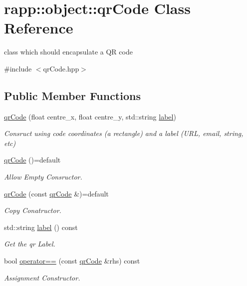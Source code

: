 \hypertarget{classrapp_1_1object_1_1qrCode}{\section{rapp\-:\-:object\-:\-:qr\-Code Class Reference}
\label{classrapp_1_1object_1_1qrCode}
}


class which should encapsulate a Q\-R code  




{\ttfamily \#include $<$qr\-Code.\-hpp$>$}

\subsection*{Public Member Functions}
\begin{DoxyCompactItemize}
\item 
\hyperlink{classrapp_1_1object_1_1qrCode_a554b8eae4e757f48bc4b8448e81e59a1}{qr\-Code} (float centre\-\_\-x, float centre\-\_\-y, std\-::string \hyperlink{classrapp_1_1object_1_1qrCode_aa794b7ec326c02e576d18f4eefb1728b}{label})
\begin{DoxyCompactList}\small\item\em Consruct using code coordinates (a rectangle) and a label (U\-R\-L, email, string, etc) \end{DoxyCompactList}\item 
\hyperlink{classrapp_1_1object_1_1qrCode_ae1be3ca19c3264e6963ec8ccfdfb5c76}{qr\-Code} ()=default
\begin{DoxyCompactList}\small\item\em Allow Empty Consructor. \end{DoxyCompactList}\item 
\hyperlink{classrapp_1_1object_1_1qrCode_a3b640b791a571346951967a8971f8a65}{qr\-Code} (const \hyperlink{classrapp_1_1object_1_1qrCode}{qr\-Code} \&)=default
\begin{DoxyCompactList}\small\item\em Copy Conatructor. \end{DoxyCompactList}\item 
std\-::string \hyperlink{classrapp_1_1object_1_1qrCode_aa794b7ec326c02e576d18f4eefb1728b}{label} () const 
\begin{DoxyCompactList}\small\item\em Get the qr Label. \end{DoxyCompactList}\item 
bool \hyperlink{classrapp_1_1object_1_1qrCode_a5bee3345d72a2c9f72c1bc6f681264fb}{operator==} (const \hyperlink{classrapp_1_1object_1_1qrCode}{qr\-Code} \&rhs) const 
\begin{DoxyCompactList}\small\item\em Assignment Constructor. \end{DoxyCompactList}\end{DoxyCompactItemize}
